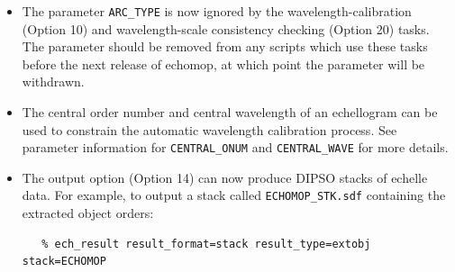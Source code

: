 \documentclass[11pt,twoside]{article}
\newcommand{\htmlref}[2]{#1}
\begin{document}
\begin{itemize}
\item The parameter \htmlref{{\tt{ARC\_TYPE}}}{par_ARC_TYPE} is
   now ignored by the wavelength-calibration
   (Option 10) and wavelength-scale consistency checking (Option 20)
   tasks.  The parameter should be removed from any scripts which use
   these tasks before the next release of {\sc echomop,} at which point the
   parameter will be withdrawn.
\item The central order number and central wavelength of an
   echellogram can be used to constrain the automatic wavelength
   calibration process.  See parameter information for
   \htmlref{{\tt{CENTRAL\_ONUM}}}{par_CENTRAL_ONUM}
   and \htmlref{{\tt{CENTRAL\_WAVE}}}{par_CENTRAL_WAVE} for more details.
\item The output option (Option 14) can now produce DIPSO stacks of
   echelle data.  For example, to output a stack called
   \texttt{ECHOMOP\_STK.sdf} containing the extracted object orders:

\begin{verbatim}
   % ech_result result_format=stack result_type=extobj stack=ECHOMOP
\end{verbatim}


\end{itemize}
\end{document}
